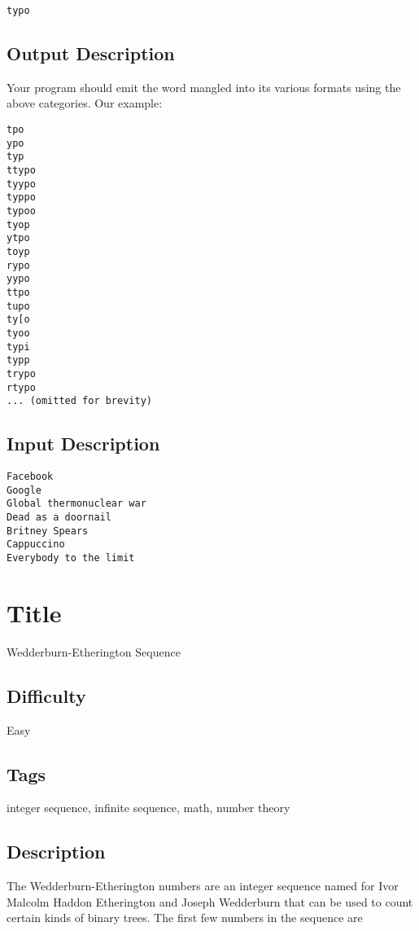 \begin{verbatim}
typo
\end{verbatim}

\subsection{Output Description}\label{output-description-29}

Your program should emit the word mangled into its various formats using
the above categories. Our example:

\begin{verbatim}
tpo
ypo
typ
ttypo
tyypo
typpo
typoo
tyop
ytpo
toyp
rypo
yypo
ttpo
tupo
ty[o
tyoo
typi
typp
trypo
rtypo
... (omitted for brevity)
\end{verbatim}

\subsection{Input Description}\label{input-description-28}

\begin{verbatim}
Facebook
Google
Global thermonuclear war
Dead as a doornail
Britney Spears
Cappuccino
Everybody to the limit
\end{verbatim}

\section{Title}\label{title-41}

Wedderburn-Etherington Sequence

\subsection{Difficulty}\label{difficulty-40}

Easy

\subsection{Tags}\label{tags-41}

integer sequence, infinite sequence, math, number theory

\subsection{Description}\label{description-41}

The Wedderburn-Etherington numbers are an integer sequence named for
Ivor Malcolm Haddon Etherington and Joseph Wedderburn that can be used
to count certain kinds of binary trees. The first few numbers in the
sequence are

